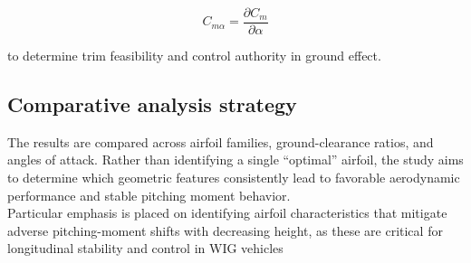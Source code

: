 \[C_{m\alpha} = \frac{\partial C_m}{\partial \alpha}\]

to determine trim feasibility and control authority in ground effect.

\subsection{Comparative analysis strategy}

The results are compared across airfoil families, ground-clearance ratios, and angles of attack. Rather than identifying a single “optimal” airfoil, the study aims to determine which geometric features consistently lead to favorable aerodynamic performance and stable pitching moment behavior.\\

\noindent Particular emphasis is placed on identifying airfoil characteristics that mitigate adverse pitching-moment shifts with decreasing height, as these are critical for longitudinal stability and control in WIG vehicles